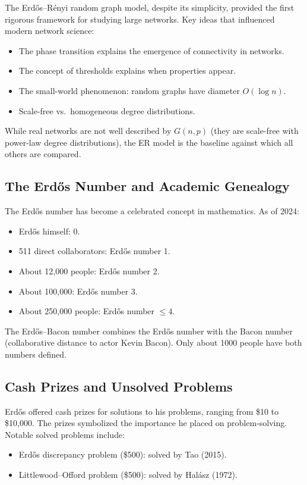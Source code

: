 The Erd\H{o}s--R\'{e}nyi random graph model, despite its simplicity, provided the first rigorous framework for studying large networks. Key ideas that influenced modern network science:
\begin{itemize}
    \item The phase transition explains the emergence of connectivity in networks.
    \item The concept of thresholds explains when properties appear.
    \item The small-world phenomenon: random graphs have diameter $O(\log n)$.
    \item Scale-free vs.\ homogeneous degree distributions.
\end{itemize}

While real networks are not well described by $G(n,p)$ (they are scale-free with power-law degree distributions), the ER model is the baseline against which all others are compared.

\subsection{The Erd\H{o}s Number and Academic Genealogy}

The Erd\H{o}s number has become a celebrated concept in mathematics. As of 2024:
\begin{itemize}
    \item Erd\H{o}s himself: 0.
    \item 511 direct collaborators: Erd\H{o}s number 1.
    \item About 12,000 people: Erd\H{o}s number 2.
    \item About 100,000: Erd\H{o}s number 3.
    \item About 250,000 people: Erd\H{o}s number $\leq 4$.
\end{itemize}

The Erd\H{o}s--Bacon number combines the Erd\H{o}s number with the Bacon number (collaborative distance to actor Kevin Bacon). Only about 1000 people have both numbers defined.

\subsection{Cash Prizes and Unsolved Problems}

Erd\H{o}s offered cash prizes for solutions to his problems, ranging from \$10 to \$10,000. The prizes symbolized the importance he placed on problem-solving. Notable solved problems include:
\begin{itemize}
    \item Erd\H{o}s discrepancy problem (\$500): solved by Tao (2015).
    \item Littlewood--Offord problem (\$500): solved by Hal\'{a}sz (1972).
\end{itemize}

